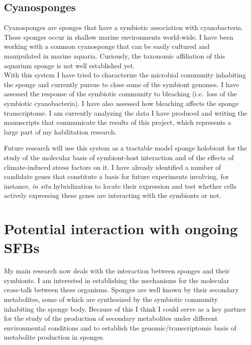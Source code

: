 \documentclass[a4paper,11pt]{article}
\begin{document}
\subsection*{Cyanosponges}

Cyanosponges are sponges that have a symbiotic association with cyanobacteria. These sponges occur in shallow marine environments world-wide. I have been working with a common cyanosponge that can be easily cultured and manipulated in marine aquaria. Curiously, the taxonomic affiliation of this aquarium sponge is not well established yet.\\

With this system I have tried to characterize the microbial community inhabiting the sponge and currently pursue to close some of the symbiont genomes. I have assessed the response of the symbiotic community to bleaching (i.e.~loss of the symbiotic cyanobacteria). I have also assessed how bleaching affects the sponge transcriptome. I am currently analyzing the data I have produced and writing the manuscripts that communicate the results of this project, which represents a large part of my habilitation research.

Future research will use this system as a tractable model sponge holobiont for the study of the molecular basis of symbiont-host interaction and of the effects of climate-induced stress factors on it. I have already identified a number of candidate genes that constitute a basis for future experiments involving, for instance, \emph{in situ} hybridization to locate their expression and test whether cells actively expressing these genes are interacting with the symbionts or not.

\section*{Potential interaction with ongoing SFBs}

My main research now deals with the interaction between sponges and their symbionts. I am interested in establishing the mechanisms for the molecular cross-talk between these organisms. Sponges are well known by their secondary metabolites, some of which are synthesized by the symbiotic community inhabiting the sponge body. Because of this I think I could serve as a key partner for the study of the production of secondary metabolites under different environmental conditions and to establish the genomic/transcriptomic basis of metabolite production in sponges.\\
\end{document}
